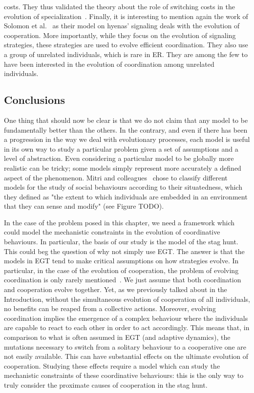 costs. They thus validated the theory about the role of switching costs in the evolution of specialization~\parencite{Duarte2011}. Finally, it is interesting to mention again the work of Solomon et al.~\parencite{Solomon2012} as their model on hyenas' signaling deals with the evolution of cooperation. More importantly, while they focus on the evolution of signaling strategies, these strategies are used to evolve efficient coordination. They also use a group of unrelated individuals, which is rare in ER. They are among the few to have been interested in the evolution of coordination among unrelated individuals. 


  \subsection{Conclusions}

    One thing that should now be clear is that we do not claim that any model to be fundamentally better than the others. In the contrary, and even if there has been a progression in the way we deal with evolutionary processes, each model is useful in its own way to study a particular problem given a set of assumptions and a level of abstraction. Even considering a particular model to be globally more realistic can be tricky; some models simply represent more accurately a defined aspect of the phenomenon. Mitri and colleagues~\parencite{Mitri2012} chose to classify different models for the study of social behaviours according to their situatedness, which they defined as "the extent to which individuals are embedded in an environment that they can sense and modify" (see Figure TODO).

    In the case of the problem posed in this chapter, we need a framework which could model the mechanistic constraints in the evolution of coordinative behaviours. In particular, the basis of our study is the model of the stag hunt. This could beg the question of why not simply use EGT. The answer is that the models in EGT tend to make critical assumptions on how strategies evolve. In particular, in the case of the evolution of cooperation, the problem of evolving coordination is only rarely mentioned~\parencite{Forber2015}. We just assume that both coordination and cooperation evolve together. Yet, as we previously talked about in the Introduction, without the simultaneous evolution of cooperation of all individuals, no benefits can be reaped from a collective actions. Moreover, evolving coordination implies the emergence of a complex behaviour where the individuals are capable to react to each other in order to act accordingly. This means that, in comparison to what is often assumed in EGT (and adaptive dynamics), the mutations necessary to switch from a solitary behaviour to a cooperative one are not easily available. This can have substantial effects on the ultimate evolution of cooperation. Studying these effects require a model which can study the mechanistic constraints of these coordinative behaviours: this is the only way to truly consider the proximate causes of cooperation in the stag hunt.

